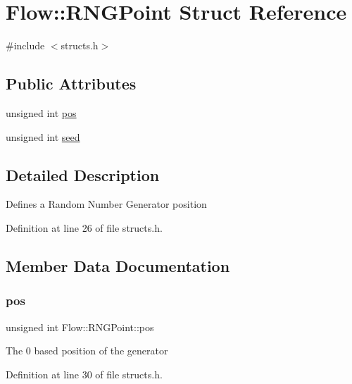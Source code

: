 \hypertarget{struct_flow_1_1_r_n_g_point}{}\section{Flow\+:\+:R\+N\+G\+Point Struct Reference}
\label{struct_flow_1_1_r_n_g_point}


{\ttfamily \#include $<$structs.\+h$>$}

\subsection*{Public Attributes}
\begin{DoxyCompactItemize}
\item 
unsigned int \hyperlink{struct_flow_1_1_r_n_g_point_ab74845257d60de9a70da8ed713266320}{pos}
\item 
unsigned int \hyperlink{struct_flow_1_1_r_n_g_point_a66e6a789454111e8639139cc9c6a630d}{seed}
\end{DoxyCompactItemize}


\subsection{Detailed Description}
Defines a Random Number Generator position 

Definition at line 26 of file structs.\+h.



\subsection{Member Data Documentation}
\hypertarget{struct_flow_1_1_r_n_g_point_ab74845257d60de9a70da8ed713266320}{}\label{struct_flow_1_1_r_n_g_point_ab74845257d60de9a70da8ed713266320} 
\subsubsection{\texorpdfstring{pos}{pos}}
{\footnotesize\ttfamily unsigned int Flow\+::\+R\+N\+G\+Point\+::pos}

The 0 based position of the generator 

Definition at line 30 of file structs.\+h.

\hypertarget{struct_flow_1_1_r_n_g_point_a66e6a789454111e8639139cc9c6a630d}{}\label{struct_flow_1_1_r_n_g_point_a66e6a789454111e8639139cc9c6a630d} 
